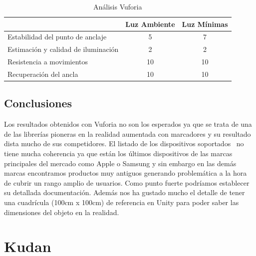 \begin{table}[H]
    \centering
     \begin{tabular}{l c c}
    \toprule
          & Luz Ambiente & Luz Mínimas \\
         \midrule
        Estabilidad del punto de anclaje   & 5 & 7\\
        
        Estimación y calidad de iluminación  &2 &2 \\
        
        Resistencia a movimientos  &10 &10 \\
        
        Recuperación del ancla  &10 &10 \\
      \bottomrule
    \end{tabular}
    \caption{Análisis Vuforia}
    \label{tab:TVuforia}
\end{table}

\subsection{Conclusiones}
Los resultados obtenidos con Vuforia no son los esperados ya que se trata de una de las librerías pioneras en la realidad aumentada con marcadores y su resultado dista mucho de sus competidores. El listado de los dispositivos soportados~\cite{Vuforia_Devices} no tiene mucha coherencia ya que están los últimos dispositivos de las marcas principales del mercado como Apple o Samsung y sin embargo en las demás marcas encontramos productos muy antiguos generando problemática a la hora de cubrir un rango amplio de usuarios. Como punto fuerte podríamos establecer su detallada documentación. Además nos ha gustado mucho el detalle de tener una cuadrícula (100cm x 100cm) de referencia en Unity para poder saber las dimensiones del objeto en la realidad.\\

\section{Kudan}
